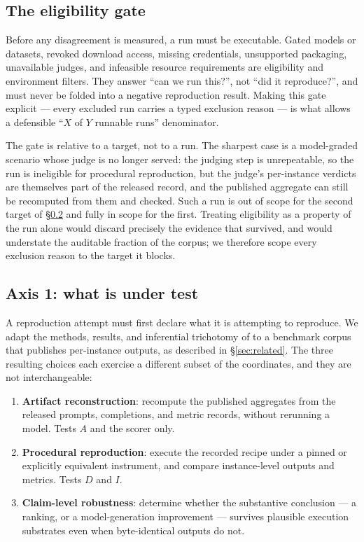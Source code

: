 \subsection{The eligibility gate}
\label{sec:gate}

Before any disagreement is measured, a run must be executable. Gated models or datasets, revoked download access, missing credentials, unsupported packaging, unavailable judges, and infeasible resource requirements are eligibility and environment filters. They answer ``can we run this?'', not ``did it reproduce?'', and must never be folded into a negative reproduction result. Making this gate explicit --- every excluded run carries a typed exclusion reason --- is what allows a defensible ``$X$ of $Y$ runnable runs'' denominator.

The gate is relative to a target, not to a run. The sharpest case is a model-graded scenario whose judge is no longer served: the judging step is unrepeatable, so the run is ineligible for procedural reproduction, but the judge's per-instance verdicts are themselves part of the released record, and the published aggregate can still be recomputed from them and checked. Such a run is out of scope for the second target of \S\ref{sec:targets} and fully in scope for the first. Treating eligibility as a property of the run alone would discard precisely the evidence that survived, and would understate the auditable fraction of the corpus; we therefore scope every exclusion reason to the target it blocks.

\subsection{Axis 1: what is under test}
\label{sec:targets}

A reproduction attempt must first declare what it is attempting to reproduce. We adapt the methods, results, and inferential trichotomy of \citet{goodman2016does} to a benchmark corpus that publishes per-instance outputs, as described in \S\ref{sec:related}. The three resulting choices each exercise a different subset of the coordinates, and they are not interchangeable:

\begin{enumerate}[nosep,leftmargin=1.6em]
  \item \textbf{Artifact reconstruction}: recompute the published aggregates from the released prompts, completions, and metric records, without rerunning a model. Tests $A$ and the scorer only.
  \item \textbf{Procedural reproduction}: execute the recorded recipe under a pinned or explicitly equivalent instrument, and compare instance-level outputs and metrics. Tests $D$ and $I$.
  \item \textbf{Claim-level robustness}: determine whether the substantive conclusion --- a ranking, or a model-generation improvement --- survives plausible execution substrates even when byte-identical outputs do not.
\end{enumerate}

